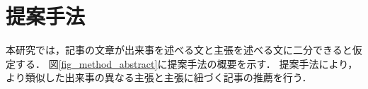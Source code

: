 \documentclass[12pt,a4j,dvipdfmx]{jreport}
\begin{document}






\chapter{提案手法}
\label{chapter_method}

本研究では，記事の文章が出来事を述べる文と主張を述べる文に二分できると仮定する．
図\ref{fig_method_abstract}に提案手法の概要を示す．
提案手法により，より類似した出来事の異なる主張と主張に紐づく記事の推薦を行う．
\end{document}
